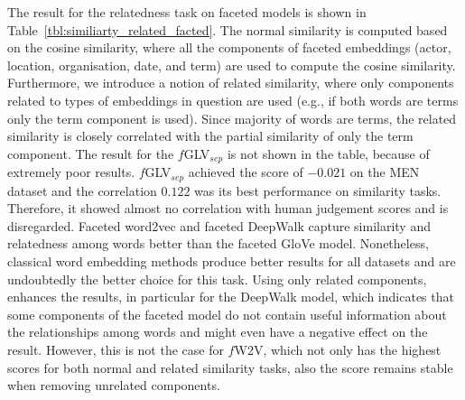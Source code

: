 The result for the relatedness task on faceted models is shown in Table~\ref{tbl:similiarty_related_facted}. The normal similarity is computed based on the cosine similarity, where all the components of faceted embeddings (actor, location, organisation, date, and term) are used to compute the cosine similarity. Furthermore, we introduce a notion of related similarity, where only components related to types of  embeddings in question are used (e.g., if both words are terms only the term component is used). Since majority of words are terms, the related similarity is closely correlated with the partial similarity of only the term component. The result for the $f$GLV$_{sep}$ is not shown in the table, because of extremely poor results.  $f$GLV$_{sep}$ achieved the score of $-0.021$ on the MEN dataset and the correlation $0.122$ was its best performance on similarity tasks. Therefore, it showed almost no correlation with human judgement scores and is disregarded. Faceted word2vec and faceted DeepWalk capture similarity and relatedness among words better than the faceted GloVe model. Nonetheless, classical word embedding methods produce better results for all datasets and are undoubtedly the better choice for this task. Using only related components, enhances the results, in particular for the DeepWalk model, which indicates that some components of the faceted model do not contain useful information about the relationships among words and might even have a negative effect on the result. However, this is not the case for $f$W2V, which not only has the highest scores for both normal and related similarity tasks, also the score remains stable when removing unrelated components. \\

